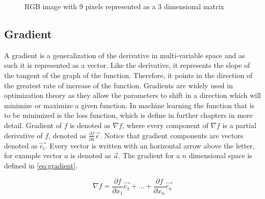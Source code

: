 \documentclass[times, utf8, diplomski]{fer}
\begin{document}
\begin{figure}
\centering
{}
\caption{RGB image with 9 pixels  represented as a 3 dimensional matrix}
\label{fig:image_matrix}
\end{figure}

\subsection{Gradient}
\label{se:gradient}
A gradient is a generalization of the derivative in multi-variable space and as such it is represented as a vector. Like the derivative, it represents the slope of the tangent of the graph of the function. Therefore, it points in the direction of the greatest rate of increase of the function. Gradients are widely used in optimization theory as they allow the parameters to shift in a direction which will minimize or maximize a given function. In machine learning the function that is to be minimized is the loss function, which is define in further chapters in more detail. Gradient of $f$ is denoted as $\nabla{f}$, where every component of $\nabla{f}$ is a partial derivative of $f$, denoted as $\frac{\partial{f}}{\partial{x}}\vec{e}$. Notice that gradient components are vectors denoted as $\vec{e_i}$. Every vector is written with an horizontal arrow above the letter, for example vector $a$ is denoted as $\vec{a}$. The gradient for a $n$ dimensional space is defined in \ref{eq:gradient}.


\begin{equation} \label{eq:gradient}
    \nabla{f}= \frac{\partial{f}}{\partial{x_{1}}}\vec{e_1} + \hdots + 	   \frac{\partial{f}}{\partial{x_{n}}}\vec{e_n}
\end{equation}
\end{document}
